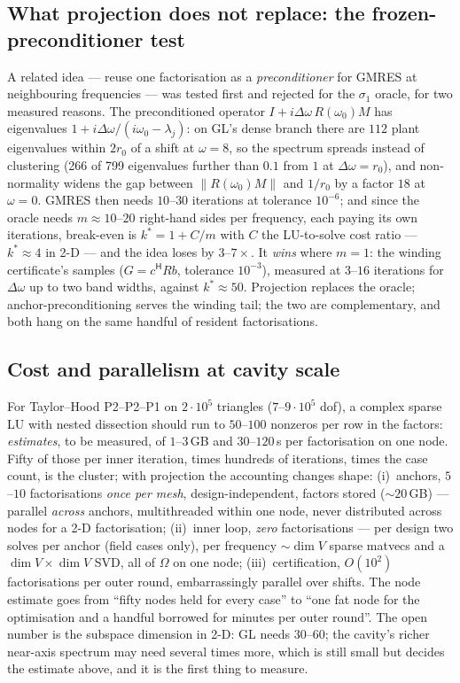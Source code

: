 \documentclass[11pt,a4paper]{article}
\newcommand{\hp}{^{\mathsf H}}
\begin{document}
{{\subsection{What projection does not replace: the frozen-preconditioner test}
\label{sec:proj-precond}
A related idea --- reuse one factorisation as a \emph{preconditioner} for GMRES at
neighbouring frequencies --- was tested first and rejected for the $\sigma_1$ oracle, for
two measured reasons.  The preconditioned operator $I+i\Delta\omega\,R(\omega_0)M$ has
eigenvalues $1+i\Delta\omega/(i\omega_0-\lambda_j)$: on GL's dense branch there are $112$
plant eigenvalues within $2r_0$ of a shift at $\omega=8$, so the spectrum spreads instead
of clustering (266 of 799 eigenvalues further than $0.1$ from $1$ at $\Delta\omega=r_0$),
and non-normality widens the gap between $\|R(\omega_0)M\|$ and $1/r_0$ by a factor $18$
at $\omega=0$.  GMRES then needs $10$--$30$ iterations at tolerance $10^{-6}$; and since
the oracle needs $m\approx10$--$20$ right-hand sides per frequency, each paying its own
iterations, break-even is $k^\ast=1+C/m$ with $C$ the LU-to-solve cost ratio ---
$k^\ast\approx4$ in 2-D --- and the idea loses by $3$--$7\times$.  It \emph{wins} where
$m=1$: the winding certificate's samples ($G=c\hp Rb$, tolerance $10^{-3}$), measured
at $3$--$16$ iterations for $\Delta\omega$ up to two band widths, against $k^\ast\approx50$.
Projection replaces the oracle; anchor-preconditioning serves the winding tail; the two
are complementary, and both hang on the same handful of resident factorisations.

\subsection{Cost and parallelism at cavity scale}
\label{sec:proj-cost}
For Taylor--Hood P2--P2--P1 on $2\cdot10^5$ triangles ($7$--$9\cdot10^5$ dof), a complex
sparse LU with nested dissection should run to $50$--$100$ nonzeros per row in the factors:
\emph{estimates}, to be measured, of $1$--$3$\,GB and $30$--$120$\,s per factorisation on
one node.  Fifty of those per inner iteration, times hundreds of iterations, times the
case count, is the cluster; with projection the accounting changes shape: (i)~anchors,
$5$--$10$ factorisations \emph{once per mesh}, design-independent, factors stored
($\sim20$\,GB) --- parallel \emph{across} anchors, multithreaded within one node, never
distributed across nodes for a 2-D factorisation; (ii)~inner loop, \emph{zero}
factorisations --- per design two solves per anchor (field cases only), per frequency
$\sim\dim V$ sparse matvecs and a $\dim V\times\dim V$ SVD, all of $\Omega$ on one node;
(iii)~certification, $O(10^2)$ factorisations per outer round, embarrassingly parallel
over shifts.  The node estimate goes from ``fifty nodes held for every case'' to ``one
fat node for the optimisation and a handful borrowed for minutes per outer round''.
The open number is the subspace dimension in 2-D: GL needs $30$--$60$; the cavity's richer
near-axis spectrum may need several times more, which is still small but decides the
estimate above, and it is the first thing to measure.}

}
\end{document}
